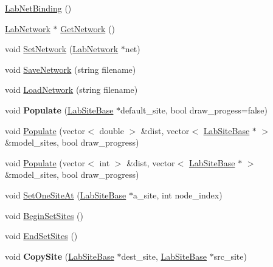 \begin{DoxyCompactItemize}
\item 
\hyperlink{classelps_1_1_lab_net_binding_a5bfba50f006b550a756e3742abeee28c}{Lab\+Net\+Binding} ()
\item 
\hyperlink{classelps_1_1_lab_network}{Lab\+Network} $\ast$ \hyperlink{classelps_1_1_lab_net_binding_a780e15524a2ef737dabb871709ac0fca}{Get\+Network} ()
\item 
void \hyperlink{classelps_1_1_lab_net_binding_a2f04bbcbc98e2ee3ff5ce0d780b449fe}{Set\+Network} (\hyperlink{classelps_1_1_lab_network}{Lab\+Network} $\ast$net)
\item 
void \hyperlink{classelps_1_1_lab_net_binding_a9f2d4e6443f428c5b8674036564ce7bb}{Save\+Network} (string filename)
\item 
void \hyperlink{classelps_1_1_lab_net_binding_adf6271082860137822c9da782b2cd6fc}{Load\+Network} (string filename)
\item 
\hypertarget{classelps_1_1_lab_net_binding_a50ff38ac3def2486dba6215ba0f694ec}{void {\bfseries Populate} (\hyperlink{classelps_1_1_lab_site_base}{Lab\+Site\+Base} $\ast$default\+\_\+site, bool draw\+\_\+progess=false)}\label{classelps_1_1_lab_net_binding_a50ff38ac3def2486dba6215ba0f694ec}

\item 
void \hyperlink{classelps_1_1_lab_net_binding_a18a49d2e7aabfb0e18855932b6b460a4}{Populate} (vector$<$ double $>$ \&dist, vector$<$ \hyperlink{classelps_1_1_lab_site_base}{Lab\+Site\+Base} $\ast$ $>$ \&model\+\_\+sites, bool draw\+\_\+progress)
\item 
void \hyperlink{classelps_1_1_lab_net_binding_ae84007da60031d8eea06cb69b29d0afc}{Populate} (vector$<$ int $>$ \&dist, vector$<$ \hyperlink{classelps_1_1_lab_site_base}{Lab\+Site\+Base} $\ast$ $>$ \&model\+\_\+sites, bool draw\+\_\+progress)
\item 
void \hyperlink{classelps_1_1_lab_net_binding_a01252ce665eee62d70d9c15f132e3650}{Set\+One\+Site\+At} (\hyperlink{classelps_1_1_lab_site_base}{Lab\+Site\+Base} $\ast$a\+\_\+site, int node\+\_\+index)
\item 
void \hyperlink{classelps_1_1_lab_net_binding_aaa4cc805e3e81240418beee789d3d087}{Begin\+Set\+Sites} ()
\item 
void \hyperlink{classelps_1_1_lab_net_binding_a1a9d7235dda3a7001d1420b1b3efc892}{End\+Set\+Sites} ()
\item 
\hypertarget{classelps_1_1_lab_net_binding_a730f2ea859a1021b464cff1d5bc6be5e}{void {\bfseries Copy\+Site} (\hyperlink{classelps_1_1_lab_site_base}{Lab\+Site\+Base} $\ast$dest\+\_\+site, \hyperlink{classelps_1_1_lab_site_base}{Lab\+Site\+Base} $\ast$src\+\_\+site)}\label{classelps_1_1_lab_net_binding_a730f2ea859a1021b464cff1d5bc6be5e}


\end{DoxyCompactItemize}
